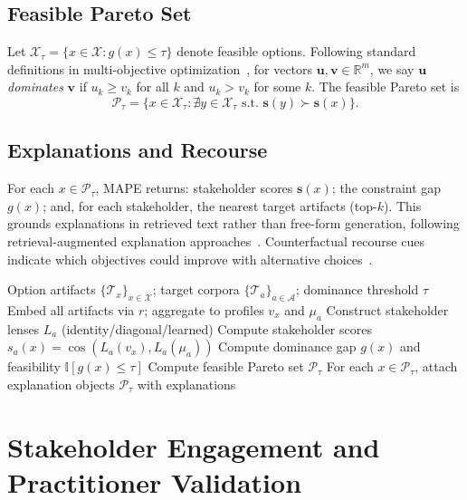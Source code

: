 \documentclass[sigconf,review]{acmart}
\newcommand{\ADS}{\textsc{ADS}\xspace}
\newcommand{\MAPE}{\textsc{MAPE}\xspace}
\begin{document}
\subsection{Feasible Pareto Set}
Let $\mathcal{X}_\tau=\{x\in\mathcal{X}: g(x)\le\tau\}$ denote feasible options. Following standard definitions in multi-objective optimization~\cite{deb2002nsga2}, for vectors $\mathbf{u},\mathbf{v}\in\mathbb{R}^m$, we say $\mathbf{u}$ \emph{dominates} $\mathbf{v}$ if $u_k\ge v_k$ for all $k$ and $u_k>v_k$ for some $k$. The feasible Pareto set is
\begin{equation}
  \mathcal{P}_\tau = \big\{x\in\mathcal{X}_\tau : \nexists y\in\mathcal{X}_\tau \text{ s.t. } \mathbf{s}(y)\succ \mathbf{s}(x)\big\}.
\end{equation}

\subsection{Explanations and Recourse}
For each $x\in\mathcal{P}_\tau$, \MAPE returns: stakeholder scores $\mathbf{s}(x)$; the constraint gap $g(x)$; and, for each stakeholder, the nearest target artifacts (top-$k$). This grounds explanations in retrieved text rather than free-form generation, following retrieval-augmented explanation approaches~\cite{zhang2020explainableRS}. Counterfactual recourse cues indicate which objectives could improve with alternative choices~\cite{wachter2017counterfactual,ustun2019recourse}.

\begin{algorithm}[t]
\caption{\MAPE in \ADS (prototype pipeline)}
\label{alg:mape}
\begin{algorithmic}[1]
\REQUIRE Option artifacts $\{\mathcal{T}_x\}_{x\in\mathcal{X}}$; target corpora $\{\mathcal{T}_a\}_{a\in\mathcal{A}}$; dominance threshold $\tau$
\STATE Embed all artifacts via $r$; aggregate to profiles $v_x$ and $\mu_a$
\STATE Construct stakeholder lenses $L_a$ (identity/diagonal/learned)
  \STATE Compute stakeholder scores $s_a(x)=\cos(L_a(v_x),L_a(\mu_a))$
  \STATE Compute dominance gap $g(x)$ and feasibility $\mathbb{I}[g(x)\le\tau]$
\ENDFOR
\STATE Compute feasible Pareto set $\mathcal{P}_\tau$
\STATE For each $x\in\mathcal{P}_\tau$, attach explanation objects
\RETURN $\mathcal{P}_\tau$ with explanations
\end{algorithmic}
\end{algorithm}


\section{Stakeholder Engagement and Practitioner Validation}
\label{sec:collab}
\end{document}
